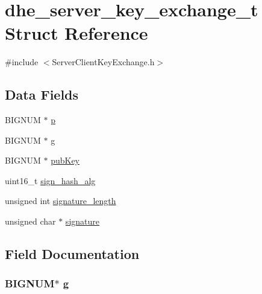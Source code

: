 \hypertarget{structdhe__server__key__exchange__t}{}\section{dhe\+\_\+server\+\_\+key\+\_\+exchange\+\_\+t Struct Reference}
\label{structdhe__server__key__exchange__t}


{\ttfamily \#include $<$Server\+Client\+Key\+Exchange.\+h$>$}

\subsection*{Data Fields}
\begin{DoxyCompactItemize}
\item 
B\+I\+G\+N\+UM $\ast$ \hyperlink{structdhe__server__key__exchange__t_a4ed2e531b9fd8a6ca6ad6804565299a7}{p}
\item 
B\+I\+G\+N\+UM $\ast$ \hyperlink{structdhe__server__key__exchange__t_ada27d9fb07daaac14be19b4ce12a7400}{g}
\item 
B\+I\+G\+N\+UM $\ast$ \hyperlink{structdhe__server__key__exchange__t_a1aca399a862132922f9cabef045d11e3}{pub\+Key}
\item 
uint16\+\_\+t \hyperlink{structdhe__server__key__exchange__t_a07ea01aadbb81f38a9a27e324d11f54e}{sign\+\_\+hash\+\_\+alg}
\item 
unsigned int \hyperlink{structdhe__server__key__exchange__t_a23a683d5129246d9adbd0029612d06a8}{signature\+\_\+length}
\item 
unsigned char $\ast$ \hyperlink{structdhe__server__key__exchange__t_a775505f2a74638cda44fdd79c4e07993}{signature}
\end{DoxyCompactItemize}


\subsection{Field Documentation}
\subsubsection[{\texorpdfstring{g}{g}}]{\setlength{\rightskip}{0pt plus 5cm}B\+I\+G\+N\+UM$\ast$ g}\hypertarget{structdhe__server__key__exchange__t_ada27d9fb07daaac14be19b4ce12a7400}{}\label{structdhe__server__key__exchange__t_ada27d9fb07daaac14be19b4ce12a7400}


